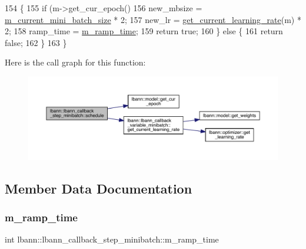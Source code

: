 \begin{DoxyCode}
154                                                             \{
155   \textcolor{keywordflow}{if} (m->get\_cur\_epoch() %
156     new\_mbsize = \hyperlink{classlbann_1_1lbann__callback__variable__minibatch_a6488bd1f45110a1cb22553e5035003de}{m\_current\_mini\_batch\_size} * 2;
157     new\_lr = \hyperlink{classlbann_1_1lbann__callback__variable__minibatch_a9de892c44231eadbbc7d27cfcc340ce2}{get\_current\_learning\_rate}(m) * 2;
158     ramp\_time = \hyperlink{classlbann_1_1lbann__callback__step__minibatch_ad367d8969b52755f768085d8db98449c}{m\_ramp\_time};
159     \textcolor{keywordflow}{return} \textcolor{keyword}{true};
160   \} \textcolor{keywordflow}{else} \{
161     \textcolor{keywordflow}{return} \textcolor{keyword}{false};
162   \}
163 \}
\end{DoxyCode}
Here is the call graph for this function\+:\nopagebreak
\begin{figure}[H]
\begin{center}
\leavevmode
\includegraphics[width=350pt]{classlbann_1_1lbann__callback__step__minibatch_a9ed85aa78f6e4fe4cf3427f9257a4610_cgraph}
\end{center}
\end{figure}


\subsection{Member Data Documentation}
\mbox{\label{classlbann_1_1lbann__callback__step__minibatch_ad367d8969b52755f768085d8db98449c}} 
\subsubsection{\texorpdfstring{m\+\_\+ramp\+\_\+time}{m\_ramp\_time}}
{\footnotesize\ttfamily int lbann\+::lbann\+\_\+callback\+\_\+step\+\_\+minibatch\+::m\+\_\+ramp\+\_\+time\hspace{0.3cm}{\ttfamily [protected]}}



